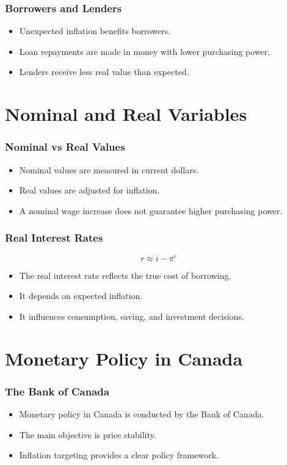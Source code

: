 \documentclass[aspectratio=169]{beamer}
\begin{document}
\begin{frame}
\transfade
\frametitle{Borrowers and Lenders}
\begin{itemize}[<+->]
\item Unexpected inflation benefits borrowers.
\item Loan repayments are made in money with lower purchasing power.
\item Lenders receive less real value than expected.
\end{itemize}
\end{frame}

\section{Nominal and Real Variables}

\begin{frame}
\transfade
\frametitle{Nominal vs Real Values}
\begin{itemize}[<+->]
\item Nominal values are measured in current dollars.
\item Real values are adjusted for inflation.
\item A nominal wage increase does not guarantee higher purchasing power.
\end{itemize}
\end{frame}

\begin{frame}
\transfade
\frametitle{Real Interest Rates}
\[
r \approx i - \pi^e
\]
\begin{itemize}[<+->]
\item The real interest rate reflects the true cost of borrowing.
\item It depends on expected inflation.
\item It influences consumption, saving, and investment decisions.
\end{itemize}
\end{frame}

\section{Monetary Policy in Canada}

\begin{frame}
\transfade
\frametitle{The Bank of Canada}
\begin{itemize}[<+->]
\item Monetary policy in Canada is conducted by the Bank of Canada.
\item The main objective is price stability.
\item Inflation targeting provides a clear policy framework.
\end{itemize}
\end{frame}
\end{document}
